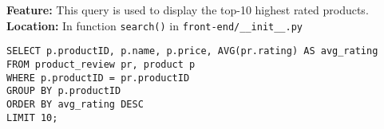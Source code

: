 \textbf{Feature:} This query is used to display the top-10 highest rated products. \\
\textbf{Location:} In function \texttt{search()} in \texttt{front-end/\_\_init\_\_.py}

\begin{lstlisting}
SELECT p.productID, p.name, p.price, AVG(pr.rating) AS avg_rating
FROM product_review pr, product p
WHERE p.productID = pr.productID
GROUP BY p.productID
ORDER BY avg_rating DESC
LIMIT 10;
\end{lstlisting}